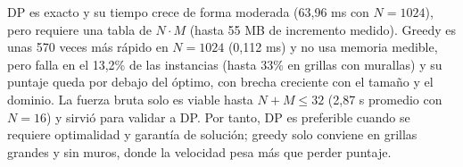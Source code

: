 DP es exacto y su tiempo crece de forma moderada (63,96 ms con $N=1024$), pero requiere una tabla de $N\cdot M$ (hasta 55 MB de incremento medido). Greedy es unas 570 veces más rápido en $N=1024$ (0,112 ms) y no usa memoria medible, pero falla en el 13,2\% de las instancias (hasta 33\% en grillas con murallas) y su puntaje queda por debajo del óptimo, con brecha creciente con el tamaño y el dominio. La fuerza bruta solo es viable hasta $N+M\le32$ (2,87 s promedio con $N=16$) y sirvió para validar a DP. Por tanto, DP es preferible cuando se requiere optimalidad y garantía de solución; greedy solo conviene en grillas grandes y sin muros, donde la velocidad pesa más que perder puntaje.
